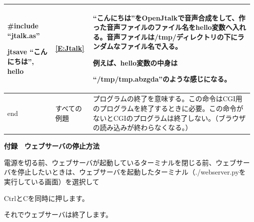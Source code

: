 \documentclass[a4paper,12pt,dvipdfmx]{jarticle}
\begin{document}
\begin{flushleft}
\begin{supertabular}{|m{5.467cm}|m{3.181cm}|m{7.7cm}|}
		\#include “jtalk.as”

		jtsave “こんにちは”, hello &
		\ref*{E:Jtalk} &
		“こんにちは”をOpenJtalkで音声合成をして、作った音声ファイルのファイル名をhello変数へ入れる。音声ファイルは/tmp/ディレクトリの下にランダムなファイル名で入る。

		例えば、hello変数の中身は

		“/tmp/tmp.abzgda”のような感じになる。 \\\hline
		end &
		すべての例題 &
		プログラムの終了を意味する。この命令はCGI用のプログラムを終了するときに必要。この命令がないとCGIのプログラムは終了しない。（ブラウザの読み込みが終わらなくなる。）\\\hline
	\end{supertabular}
\end{flushleft}

\bigskip

{\bfseries
	付録　ウェブサーバの停止方法}

電源を切る前、ウェブサーバが起動しているターミナルを閉じる前、ウェブサーバを停止したいときは、ウェブサーバを起動したターミナル（./webserver.pyを実行している画面）を選択して


\bigskip

CtrlとCを同時に押します。


\bigskip

それでウェブサーバは終了します。


\bigskip


\bigskip


\bigskip
\end{document}
